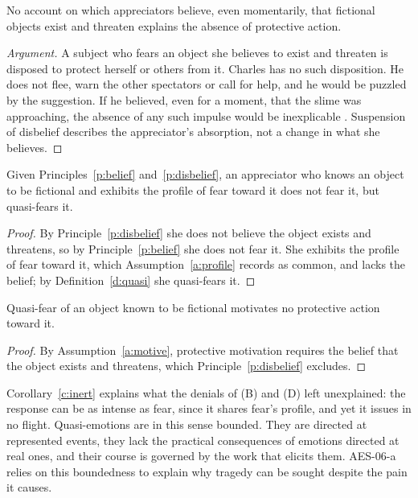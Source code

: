 \documentclass{situationist-preprint}
\begin{document}
\begin{lemma}\label{l:susp}
No account on which appreciators believe, even momentarily, that fictional objects exist and threaten explains the absence of protective action.
\end{lemma}

\begin{proof}[Argument]
A subject who fears an object she believes to exist and threaten is disposed to protect herself or others from it. Charles has no such disposition. He does not flee, warn the other spectators or call for help, and he would be puzzled by the suggestion. If he believed, even for a moment, that the slime was approaching, the absence of any such impulse would be inexplicable \citep{Walton1978}. Suspension of disbelief describes the appreciator's absorption, not a change in what she believes.
\end{proof}

\begin{theorem}[Resolution]\label{t:main}
Given Principles~\ref{p:belief} and~\ref{p:disbelief}, an appreciator who knows an object to be fictional and exhibits the profile of fear toward it does not fear it, but quasi-fears it.
\end{theorem}

\begin{proof}
By Principle~\ref{p:disbelief} she does not believe the object exists and threatens, so by Principle~\ref{p:belief} she does not fear it. She exhibits the profile of fear toward it, which Assumption~\ref{a:profile} records as common, and lacks the belief; by Definition~\ref{d:quasi} she quasi-fears it.
\end{proof}

\begin{corollary}\label{c:inert}
Quasi-fear of an object known to be fictional motivates no protective action toward it.
\end{corollary}

\begin{proof}
By Assumption~\ref{a:motive}, protective motivation requires the belief that the object exists and threatens, which Principle~\ref{p:disbelief} excludes.
\end{proof}

Corollary~\ref{c:inert} explains what the denials of (B) and (D) left unexplained: the response can be as intense as fear, since it shares fear's profile, and yet it issues in no flight. Quasi-emotions are in this sense bounded. They are directed at represented events, they lack the practical consequences of emotions directed at real ones, and their course is governed by the work that elicits them. AES-06-a relies on this boundedness to explain why tragedy can be sought despite the pain it causes.
\end{document}
